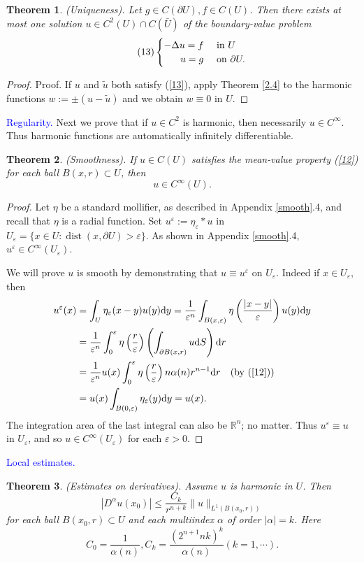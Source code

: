 \documentclass[hyperref,UTF8,12pt]{article}
\numberwithin{equation}{subsection}
\theoremstyle{plain}
\newtheorem{theorem}{Theorem}
\theoremstyle{definition}
\numberwithin{theorem}{section}
\numberwithin{lemma}{section}
\numberwithin{proposition}{section}
\numberwithin{remark}{section}
\numberwithin{corollary}{section}
\numberwithin{definition}{section}
\numberwithin{problem}{section}
\numberwithin{example}{section}
\def\dif{\textup{d}}
\newcommand{\ptl}{\partial}
\newcommand{\mr}{\mathbb{R}}
\renewcommand{\leq}{\leqslant}
\newcommand{\ve}{\varepsilon}
\begin{document}
\begin{theorem}\label{thm2.5}
(Uniqueness). Let $g\in C(\ptl U),f\in C(U)$. Then there exists at most one solution $u\in C^2(U)\cap C(\bar{U})$ of the boundary-value problem\[\tag{13}\label{13}\begin{cases}
	\hfill-\Delta u=f&\text{~in }U\\
	\hfill u=g&\text{~on }\ptl U.
\end{cases}\]
\end{theorem}
\begin{proof}
Proof. If $u$ and $\tilde{u}$ both satisfy (\ref{13}), apply Theorem \ref{2.4} to the harmonic functions $w:= \pm(u-\tilde{u})$ and we obtain $w\equiv0$ in $U$.
\end{proof}
\noindent\textcolor{blue}{Regularity.} Next we prove that if $u\in C^2$ is harmonic, then necessarily $u\in C^\infty$. Thus harmonic functions are automatically infinitely differentiable.
\begin{theorem}\label{thm2.6}
(Smoothness). If $u\in C(U)$ satisfies the mean-value property \textup{(\ref{12})} for each ball $B(x,r)\subset U$, then\[u\in C^\infty(U).\]
\end{theorem}
\begin{proof}
Let $\eta$ be a standard mollifier, as described in Appendix \ref{smooth}.4, and recall that $\eta$ is a radial function. Set $u^\ve:=\eta_\ve*u$ in $U_\ve=\{x\in U: \operatorname{dist}(x,\ptl U)>\ve\}$. As shown in Appendix \ref{smooth}.4, $u^\ve\in C^\infty(U_\ve)$.

We will prove $u$ is smooth by demonstrating that $u\equiv u^\ve$ on $U_\ve$. Indeed if $x\in U_\ve$, then \[\begin{aligned}
	u^\ve(x) & =\int_U \eta_\ve(x-y) u(y)\dif y=\frac{1}{\ve^n}\int_{B(x,\ve)}\eta\left(\frac{|x-y|}{\ve}\right)u(y)\dif y \\
	& =\frac{1}{\ve^n}\int_0^{\ve} \eta\left(\frac{r}{\ve}\right)\left(\int_{\ptl B(x, r)}u\dif S\right)\dif r\\
	& =\frac{1}{\ve^n} u(x) \int_0^{\ve} \eta\left(\frac{r}{\ve}\right) n \alpha(n) r^{n-1} \dif r\quad(\text{by}~(\ref{12}))\\
	& =u(x)\int_{B(0,\ve)}\eta_\ve(y)\dif y=u(x).
\end{aligned}\]The integration area of the last integral can also be $\mr^n$; no matter. Thus $u^\ve\equiv u$ in $U_\ve$, and so $u\in C^\infty(U_\ve)$ for each $\ve>0$.
\end{proof}
\noindent\textcolor{blue}{Local estimates.}
\begin{theorem}\label{esti}
(Estimates on derivatives). Assume $u$ is harmonic in $U$. Then
\[|D^\alpha u(x_0)|\leq\frac{C_k}{r^{n+k}}\|u\|_{L^1(B(x_0,r))}\tag{14}\label{14}\]
for each ball $B(x_0,r)\subset U$ and each multiindex $\alpha$ of order $|\alpha|=k$.
Here\[C_0=\frac{1}{\alpha(n)},C_k=\frac{(2^{n+1}nk)^k}{\alpha(n)}(k=1,\cdots).\tag{15}\label{15}\]
\end{theorem}
\end{document}
